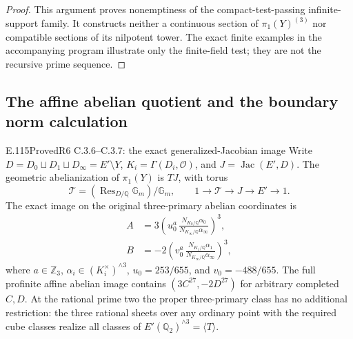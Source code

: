 \begin{proof}
This argument proves nonemptiness of the compact-test-passing
infinite-support family. It constructs neither a continuous section
of $\pi_1(Y)^{(3)}$ nor compatible sections of its nilpotent tower.
The exact finite examples in the accompanying program illustrate
only the finite-field test; they are not the recursive prime sequence.
\end{proof}

\subsection{The affine abelian quotient and the boundary norm calculation}

\begin{result}{E.115}{Proved}{R6 C.3.6--C.3.7: the exact generalized-Jacobian image}
Write $D=D_0\sqcup D_1\sqcup D_\infty=E'\setminus Y$,
$K_i=\Gamma(D_i,\mathcal O)$, and $J=\operatorname{Jac}(E',D)$.
The geometric abelianization of $\pi_1(Y)$ is $TJ$, with torus
\[
 \mathcal T=(\operatorname{Res}_{D/\mathbb Q}\mathbb G_m)/\mathbb G_m,
 \qquad 1\longrightarrow\mathcal T\longrightarrow J
       \longrightarrow E'\longrightarrow1.
\]
The exact image on the original three-primary abelian coordinates is
\[
 \begin{split}
 A&=3\left(u_0^a\,
        \frac{N_{K_0/\mathbb Q}\alpha_0}
             {N_{K_\infty/\mathbb Q}\alpha_\infty}\right)^3,\\
 B&=-2\left(v_0^a\,
        \frac{N_{K_1/\mathbb Q}\alpha_1}
             {N_{K_\infty/\mathbb Q}\alpha_\infty}\right)^3,
 \end{split}
\]
where $a\in\mathbb Z_3$, $\alpha_i\in(K_i^\times)^{\wedge3}$,
$u_0=253/655$, and $v_0=-488/655$. The full profinite affine
abelian image contains $(3C^{27},-2D^{27})$ for arbitrary completed
$C,D$. At the rational prime two the proper three-primary class
has no additional restriction: the three rational sheets over any
ordinary point with the required cube classes realize all classes
of $E'(\mathbb Q_2)^{\wedge3}=\langle T\rangle$.
\end{result}

